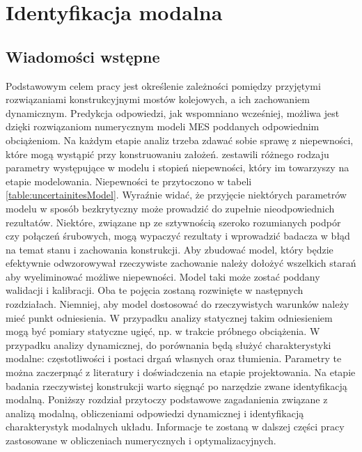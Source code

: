 \chapter{Identyfikacja modalna}

\section{Wiadomości wstępne}
Podstawowym celem pracy jest określenie zależności pomiędzy przyjętymi rozwiązaniami konstrukcyjnymi mostów kolejowych, a ich zachowaniem dynamicznym. Predykcja odpowiedzi, jak wspomniano wcześniej, możliwa jest dzięki rozwiązaniom numerycznym modeli MES poddanych odpowiednim obciążeniom. Na każdym etapie analiz trzeba zdawać sobie sprawę z niepewności, które mogą wystąpić przy konstruowaniu założeń. \cite{Brincker2015} zestawili różnego rodzaju parametry występujące w modelu i stopień niepewności, który im towarzyszy na etapie modelowania. Niepewności te przytoczono w tabeli \ref{table:uncertainitesModel}. Wyraźnie widać, że przyjęcie niektórych parametrów modelu w sposób bezkrytyczny może prowadzić do zupełnie nieodpowiednich rezultatów. Niektóre, związane np ze sztywnością szeroko rozumianych podpór czy połączeń śrubowych, mogą wypaczyć rezultaty i wprowadzić badacza w błąd na temat stanu i zachowania konstrukcji. Aby zbudować model, który będzie efektywnie odwzorowywał rzeczywiste zachowanie należy dołożyć wszelkich starań aby wyeliminować możliwe niepewności. Model taki może zostać poddany walidacji i kalibracji. Oba te pojęcia zostaną rozwinięte w następnych rozdziałach. Niemniej, aby model dostosować do rzeczywistych warunków należy mieć punkt odniesienia. W przypadku analizy statycznej takim odniesieniem mogą być pomiary statyczne ugięć, np. w trakcie próbnego obciążenia. W przypadku analizy dynamicznej, do porównania będą służyć charakterystyki modalne: częstotliwości i postaci drgań własnych oraz tłumienia. Parametry te można zaczerpnąć z literatury i doświadczenia na etapie projektowania. Na etapie badania rzeczywistej konstrukcji warto sięgnąć po narzędzie zwane identyfikacją modalną. Poniższy rozdział przytoczy podstawowe zagadanienia związane z analizą modalną, obliczeniami odpowiedzi dynamicznej i identyfikacją charakterystyk modalnych układu. Informacje te zostaną w dalszej części pracy zastosowane w obliczeniach numerycznych i optymalizacyjnych.



